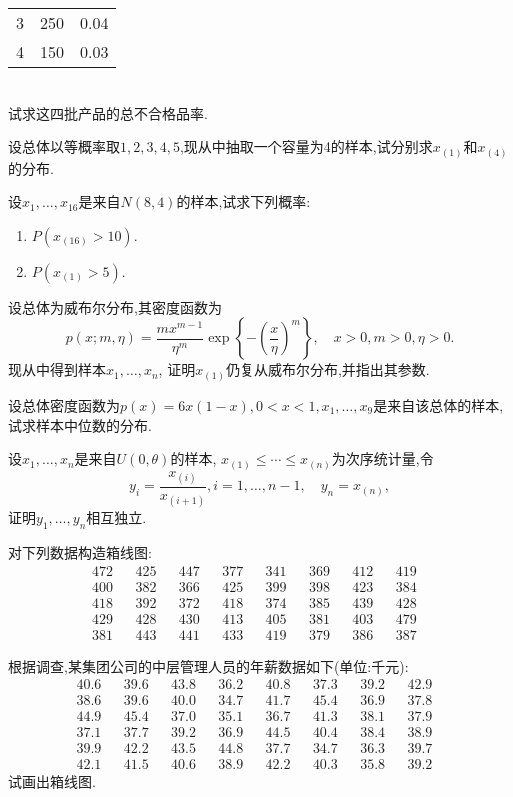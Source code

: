 \begin{xiti}
\begin{tabularx}{\textwidth}{YYY}
3&250&0.04\\
4&150&0.03\\
\bottomrule
\end{tabularx}\\[2mm]
试求这四批产品的总不合格品率.
\item 设总体以等概率取$1,2,3,4,5$,现从中抽取一个容量为4的样本,试分别求$x_{(1)}$和$x_{(4)}$的分布.
\item 设$x_1,\dotsc,x_{16}$是来自$N(8,4)$的样本,试求下列概率:
\begin{enumerate}
\item $P(x_{(16)}>10)$.
\item $P(x_{(1)}>5)$.
\end{enumerate}
\item 设总体为威布尔分布,其密度函数为
\[p(x;m,\eta)=\frac{mx^{m-1}}{\eta^m}\exp\left\{ -\left( \frac{x}{\eta} \right) ^m \right\},\quad x>0,m>0,\eta>0.\]
现从中得到样本$x_1,\dotsc,x_n$, 证明$x_{(1)}$仍复从威布尔分布,并指出其参数.
\item 设总体密度函数为$p(x)=6x(1-x),0<x<1,x_1,\dotsc,x_9$是来自该总体的样本,试求样本中位数的分布.
\item 设$x_1,\dotsc,x_n$是来自$U(0,\theta)$的样本, $x_{(1)}\leq\dotsb\leq x_{(n)}$为次序统计量,令
\[y_i=\frac{x_{(i)}}{x_{(i+1)}},i=1,\dotsc,n-1,\quad y_n=x_{(n)},\]
证明$y_1,\dotsc,y_n$相互独立.
\item 对下列数据构造箱线图:
\begin{align*}
472&&425&&447&&377&&341&&369&&412&&419&\\
400&&382&&366&&425&&399&&398&&423&&384&\\
418&&392&&372&&418&&374&&385&&439&&428&\\
429&&428&&430&&413&&405&&381&&403&&479&\\
381&&443&&441&&433&&419&&379&&386&&387&
\end{align*}
\item 根据调查,某集团公司的中层管理人员的年薪数据如下(单位:千元):
\begin{align*}
40.6&&39.6&&43.8&&36.2&&40.8&&37.3&&39.2&&42.9&\\
38.6&&39.6&&40.0&&34.7&&41.7&&45.4&&36.9&&37.8&\\
44.9&&45.4&&37.0&&35.1&&36.7&&41.3&&38.1&&37.9&\\
37.1&&37.7&&39.2&&36.9&&44.5&&40.4&&38.4&&38.9&\\
39.9&&42.2&&43.5&&44.8&&37.7&&34.7&&36.3&&39.7&\\
42.1&&41.5&&40.6&&38.9&&42.2&&40.3&&35.8&&39.2&
\end{align*}
试画出箱线图.
\end{xiti}
